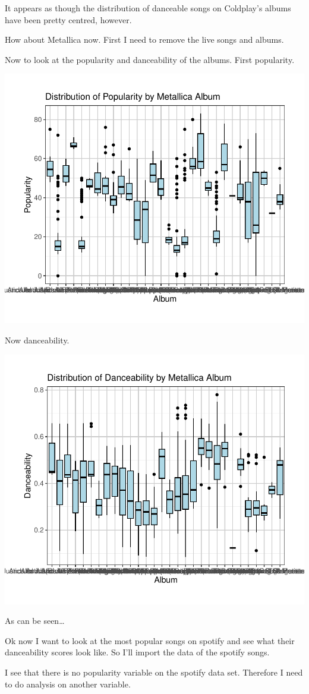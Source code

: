 \documentclass[11pt,preprint, authoryear]{elsarticle}
\numberwithin{equation}{section}
\numberwithin{figure}{section}
\numberwithin{table}{section}
\begin{document}
It appears as though the distribution of danceable songs on Coldplay's
albums have been pretty centred, however.

How about Metallica now. First I need to remove the live songs and
albums.

Now to look at the popularity and danceability of the albums. First
popularity.

\includegraphics{Question_3_files/figure-latex/unnamed-chunk-10-1.pdf}

Now danceability.

\includegraphics{Question_3_files/figure-latex/unnamed-chunk-11-1.pdf}

As can be seen\ldots{}

Ok now I want to look at the most popular songs on spotify and see what
their danceability scores look like. So I'll import the data of the
spotify songs.

I see that there is no popularity variable on the spotify data set.
Therefore I need to do analysis on another variable.


\end{document}
